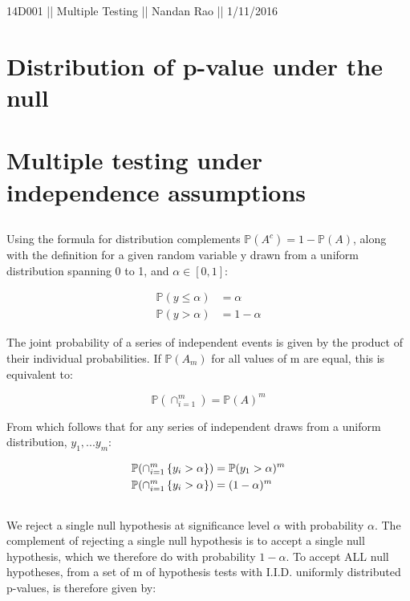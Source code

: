 \documentclass[a4paper,12pt]{article}
\begin{document}
\normalsize 14D001 || Multiple Testing || Nandan Rao || 1/11/2016

\section{Distribution of p-value under the null}

\subsection{}


\section{Multiple testing under independence assumptions}

\subsection{}

Using the formula for distribution complements $\mathbb{P}(A^c) = 1 - \mathbb{P}(A)$, along with the definition for a given random variable y drawn from a uniform distribution spanning 0 to 1, and $\alpha \in [0, 1]$:

\begin{align*}
\mathbb{P}(y \leq \alpha) &= \alpha \\
\mathbb{P}(y > \alpha) &= 1 - \alpha
\end{align*}

The joint probability of a series of independent events is given by the product of their individual probabilities. If $\mathbb{P}(A_m)$ for all values of m are equal, this is equivalent to: 
 
$$
\mathbb{P}(\cap_{i=1}^m) = \mathbb{P}(A)^m
$$

From which follows that for any series of independent draws from a uniform distribution, $y_1, ... y_m$:

\begin{align*}
\mathbb{P}(\cap_{i=1}^m \set{y_i > \alpha}) &= \mathbb{P}(y_1 > \alpha)^m \\
\mathbb{P}(\cap_{i=1}^m \set{y_i > \alpha}) &= (1 - \alpha)^m
\end{align*}

\subsection{}

We reject a single null hypothesis at significance level $\alpha$ with probability $\alpha$. The complement of rejecting a single null hypothesis is to accept a single null hypothesis, which we therefore do with probability $1 - \alpha$. To accept ALL null hypotheses, from a set of m of hypothesis tests with I.I.D. uniformly distributed p-values, is therefore given by:
\end{document}
